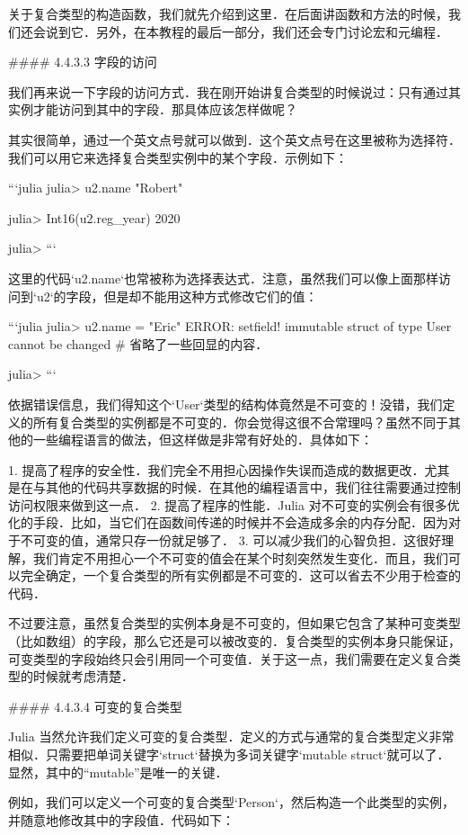 关于复合类型的构造函数，我们就先介绍到这里．在后面讲函数和方法的时候，我们还会说到它．另外，在本教程的最后一部分，我们还会专门讨论宏和元编程．

#### 4.4.3.3 字段的访问

我们再来说一下字段的访问方式．我在刚开始讲复合类型的时候说过：只有通过其实例才能访问到其中的字段．那具体应该怎样做呢？

其实很简单，通过一个英文点号就可以做到．这个英文点号在这里被称为选择符．我们可以用它来选择复合类型实例中的某个字段．示例如下：

```julia 
julia> u2.name
"Robert"

julia> Int16(u2.reg_year)
2020

julia> 
```

这里的代码`u2.name`也常被称为选择表达式．注意，虽然我们可以像上面那样访问到`u2`的字段，但是却不能用这种方式修改它们的值：

```julia
julia> u2.name = "Eric"
ERROR: setfield! immutable struct of type User cannot be changed
# 省略了一些回显的内容．

julia> 
```

依据错误信息，我们得知这个`User`类型的结构体竟然是不可变的！没错，我们定义的所有复合类型的实例都是不可变的．你会觉得这很不合常理吗？虽然不同于其他的一些编程语言的做法，但这样做是非常有好处的．具体如下：

1. 提高了程序的安全性．我们完全不用担心因操作失误而造成的数据更改．尤其是在与其他的代码共享数据的时候．在其他的编程语言中，我们往往需要通过控制访问权限来做到这一点．
2. 提高了程序的性能．Julia 对不可变的实例会有很多优化的手段．比如，当它们在函数间传递的时候并不会造成多余的内存分配．因为对于不可变的值，通常只存一份就足够了．
3. 可以减少我们的心智负担．这很好理解，我们肯定不用担心一个不可变的值会在某个时刻突然发生变化．而且，我们可以完全确定，一个复合类型的所有实例都是不可变的．这可以省去不少用于检查的代码．

不过要注意，虽然复合类型的实例本身是不可变的，但如果它包含了某种可变类型（比如数组）的字段，那么它还是可以被改变的．复合类型的实例本身只能保证，可变类型的字段始终只会引用同一个可变值．关于这一点，我们需要在定义复合类型的时候就考虑清楚．

#### 4.4.3.4 可变的复合类型

Julia 当然允许我们定义可变的复合类型．定义的方式与通常的复合类型定义非常相似．只需要把单词关键字`struct`替换为多词关键字`mutable struct`就可以了．显然，其中的“mutable”是唯一的关键．

例如，我们可以定义一个可变的复合类型`Person`，然后构造一个此类型的实例，并随意地修改其中的字段值．代码如下：

